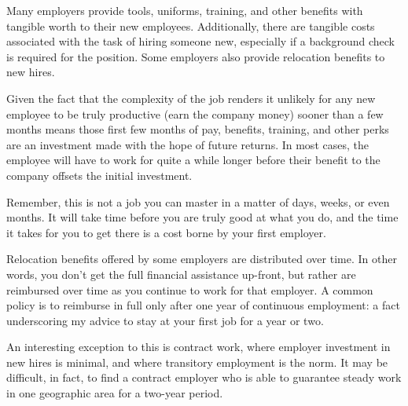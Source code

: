 Many employers provide tools, uniforms, training, and other benefits with tangible worth to their new employees.  Additionally, there are tangible costs associated with the task of hiring someone new, especially if a background check is required for the position.  Some employers also provide relocation benefits to new hires.  

Given the fact that the complexity of the job renders it unlikely for any new employee to be truly productive (earn the company money) sooner than a few months means those first few months of pay, benefits, training, and other perks are an investment made with the hope of future returns.  In most cases, the employee will have to work for quite a while longer before their benefit to the company offsets the initial investment.

Remember, this is not a job you can master in a matter of days, weeks, or even months.  It will take time before you are truly good at what you do, and the time it takes for you to get there is a cost borne by your first employer.

Relocation benefits offered by some employers are distributed over time.  In other words, you don't get the full financial assistance up-front, but rather are reimbursed over time as you continue to work for that employer.  A common policy is to reimburse in full only after one year of continuous employment: a fact underscoring my advice to stay at your first job for a year or two.

\vskip 10pt

An interesting exception to this is contract work, where employer investment in new hires is minimal, and where transitory employment is the norm.  It may be difficult, in fact, to find a contract employer who is able to guarantee steady work in one geographic area for a two-year period.
 



